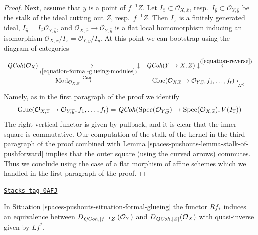 \begin{proof}
\medskip\noindent
Next, assume that $\overline{y}$ is a point of $f^{-1}Z$.
Let $I_{\overline{x}} \subset \mathcal{O}_{X, \overline{x}}$,
resp.\ $I_{\overline{y}} \subset \mathcal{O}_{Y, \overline{y}}$
be the stalk of the ideal cutting out $Z$, resp.\ $f^{-1}Z$.
Then $I_{\overline{x}}$ is a finitely generated ideal,
$I_{\overline{y}} = I_{\overline{x}}\mathcal{O}_{Y, \overline{y}}$,
and $\mathcal{O}_{X, \overline{x}} \to \mathcal{O}_{Y, \overline{y}}$
is a flat local homomorphism inducing an isomorphism
$\mathcal{O}_{X, \overline{x}}/I_{\overline{x}} =
\mathcal{O}_{Y, \overline{y}}/I_{\overline{y}}$.
At this point we can bootstrap using the diagram of categories
$$
\begin{array}{cc}\mathit{QCoh}(\mathcal{O}_X) \underset{(\ref{equation-formal-glueing-modules})}{\longrightarrow}\downarrow & \mathit{QCoh}(Y \to X, Z) \downarrow\overset{(\ref{equation-reverse})}{\longleftarrow} \\ \text{Mod}_{\mathcal{O}_{X, \overline{x}}} \overset{\text{Can}}{\longrightarrow} & \text{Glue}(\mathcal{O}_{X, \overline{x}} \to \mathcal{O}_{Y, \overline{y}},
f_1, \ldots, f_t) \underset{H^0}{\longleftarrow}\end{array}
$$
Namely, as in the first paragraph of the proof we identify
$$
\text{Glue}(\mathcal{O}_{X, \overline{x}} \to \mathcal{O}_{Y, \overline{y}},
f_1, \ldots, f_t)
=
\mathit{QCoh}(\operatorname{Spec}(\mathcal{O}_{Y, \overline{y}}) \to
\operatorname{Spec}(\mathcal{O}_{X, \overline{x}}), V(I_{\overline{x}}))
$$
The right vertical functor is given by pullback, and it is clear that
the inner square is commutative. Our computation of the stalk of the
kernel in the third paragraph of the proof combined with
Lemma \ref{spaces-pushouts-lemma-stalk-of-pushforward} implies that
the outer square (using the curved arrows) commutes. Thus we
conclude using the case of a flat morphism of affine schemes
which we handled in the first paragraph of the proof.
\end{proof}

\begin{lemma}
\label{spaces-pushouts-lemma-derived-equivalent}
\href{https://stacks.math.columbia.edu/tag/0AFJ}{\texttt{Stacks tag 0AFJ}}

In Situation \ref{spaces-pushouts-situation-formal-glueing} the functor
$Rf_*$ induces an equivalence between $D_{\mathit{QCoh}, |f^{-1}Z|}(\mathcal{O}_Y)$
and $D_{\mathit{QCoh}, |Z|}(\mathcal{O}_X)$ with quasi-inverse given by
$Lf^*$.
\end{lemma}

